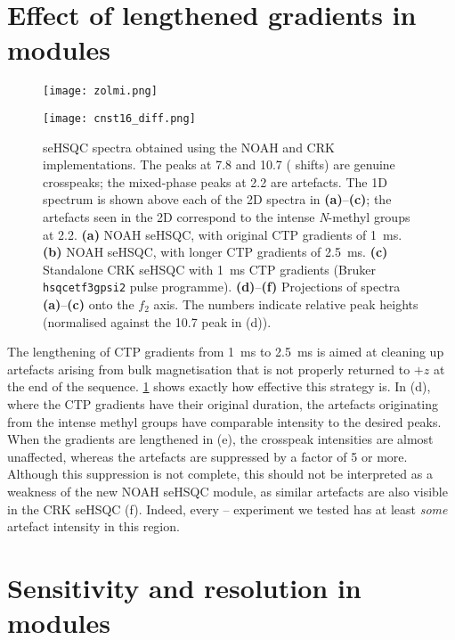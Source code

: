 \section{Effect of lengthened gradients in \texorpdfstring{\nitrogen{}}{15N} modules}
\label{section:n15_cnst16_grads}

\begin{figure}
    \centering
    \texttt{[image: zolmi.png]}\phantom{aaaaaa}

    \texttt{[image: cnst16\_diff.png]}
    \caption{
        \nitrogen{} seHSQC spectra obtained using the NOAH and CRK implementations.
        The peaks at 7.8 and \SI{10.7}{\ppm} (\proton{} shifts) are genuine crosspeaks; the mixed-phase peaks at \SI{2.2}{\ppm} are artefacts.
        The 1D \proton{} spectrum is shown above each of the 2D spectra in \textbf{(a)}--\textbf{(c)}; the artefacts seen in the 2D correspond to the intense \textit{N}-methyl groups at \SI{2.2}{\ppm}.
        \textbf{(a)} NOAH seHSQC, with original CTP gradients of \SI{1}{\ms}.
        \textbf{(b)} NOAH seHSQC, with longer CTP gradients of \SI{2.5}{\ms}.
        \textbf{(c)} Standalone CRK seHSQC with \SI{1}{\ms} CTP gradients (Bruker \texttt{hsqcetf3gpsi2} pulse programme).
        \textbf{(d)}--\textbf{(f)} Projections of spectra \textbf{(a)}--\textbf{(c)} onto the $f_2$ axis.
        The numbers indicate relative peak heights (normalised against the \SI{10.7}{\ppm} peak in (d)).
        \zolmi{}
    }
    \label{fig:cnst16_diff}
\end{figure}

The lengthening of CTP gradients from \SI{1}{\ms} to \SI{2.5}{\ms} is aimed at cleaning up artefacts arising from bulk magnetisation that is not properly returned to $+z$ at the end of the sequence.
\cref{fig:cnst16_diff} shows exactly how effective this strategy is.
In (d), where the CTP gradients have their original duration, the artefacts originating from the intense methyl groups have comparable intensity to the desired peaks.
When the gradients are lengthened in (e), the crosspeak intensities are almost unaffected, whereas the artefacts are suppressed by a factor of 5 or more.
Although this suppression is not complete, this should not be interpreted as a weakness of the new NOAH seHSQC module, as similar artefacts are also visible in the CRK seHSQC (f).
Indeed, every \proton{}--\nitrogen{} experiment we tested has at least \textit{some} artefact intensity in this region.

\section{Sensitivity and resolution in \texorpdfstring{\nitrogen{}}{15N} modules}
\label{section:n15_scaling}

